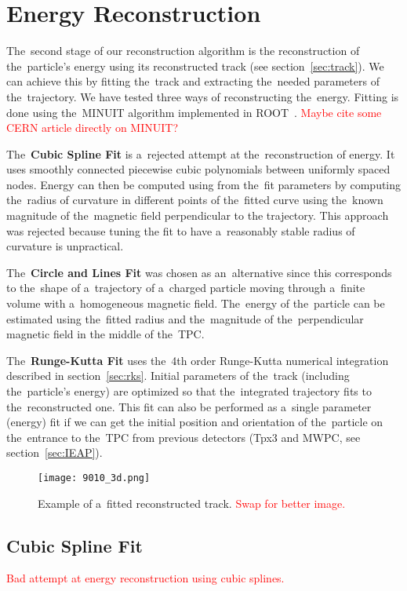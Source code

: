 \chapter{Energy Reconstruction}
\label{sec:energy}
	The~second stage of our reconstruction algorithm is the reconstruction of the~particle's energy using its reconstructed track (see section~\ref{sec:track}). We can achieve this by fitting the~track and extracting the~needed parameters of the~trajectory. We have tested three ways of reconstructing the~energy. Fitting is done using the~MINUIT algorithm implemented in ROOT~\cite{ROOT}. \textcolor{red}{Maybe cite some CERN article directly on MINUIT?}
	
	The~\textbf{Cubic Spline Fit} is a~rejected attempt at the~reconstruction of energy. It uses smoothly connected piecewise cubic polynomials between uniformly spaced nodes. Energy can then be computed using from the~fit parameters by computing the~radius of curvature in different points of the~fitted curve using the~known magnitude of the~magnetic field perpendicular to the trajectory. This approach was rejected because tuning the fit to have a~reasonably stable radius of curvature is unpractical.
	
	The~\textbf{Circle and Lines Fit} was chosen as an~alternative since this corresponds to the~shape of a~trajectory of a~charged particle moving through a~finite volume with a~homogeneous magnetic field. The~energy of the~particle can be estimated using the~fitted radius and the~magnitude of the~perpendicular magnetic field in the middle of the~\ac{TPC}.
	
	The~\textbf{Runge-Kutta Fit} uses the~4th order Runge-Kutta numerical integration described in section~\ref{sec:rks}. Initial parameters of the~track (including the~particle's energy) are optimized so that the~integrated trajectory fits to the~reconstructed one. This fit can also be performed as a~single parameter (energy) fit if we can get the initial position and orientation of the~particle on the~entrance to the~\ac{TPC} from previous detectors (\ac{Tpx3} and \ac{MWPC}, see section~\ref{sec:IEAP}).
	
	\begin{figure}
		\centering
		\texttt{[image: 9010\_3d.png]}
		\caption{Example of a~fitted reconstructed track. \textcolor{red}{Swap for better image.}}
		\label{fig:90103d}
	\end{figure}
	
	\section{Cubic Spline Fit}
		\textcolor{red}{Bad attempt at energy reconstruction using cubic splines.}
		
